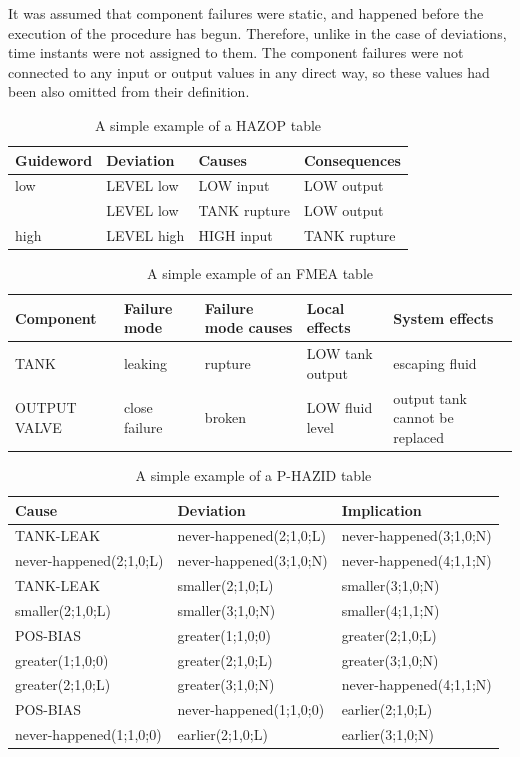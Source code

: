 \documentclass[conference]{IEEEtran}
\begin{document}
It was assumed that component failures were static, and happened before the execution of the procedure has begun. Therefore, unlike in the case of deviations, time instants were not assigned to them. The component failures were not connected to any input or output values in any direct way, so these values had been also omitted from their definition. 

\begin{table}
\centering
\begin{tabular}{|l|l|l|l|}
\hline
Guideword & Deviation & Causes & Consequences \\
\hline
\hline
low & LEVEL low & LOW input & LOW output \\
& LEVEL low & TANK rupture & LOW output \\
\hline
high & LEVEL high & HIGH input & TANK rupture \\
\hline
\end{tabular}
\caption{A simple example of a HAZOP table}
\label{tab:ehazop}
\end{table}

\begin{table}
\centering
\begin{tabular}{|l|l|l|l|l|}
\hline
Component & Failure mode & Failure mode causes & Local effects & System effects \\
\hline
\hline
TANK & leaking & rupture & LOW tank output & escaping fluid \\
\hline
OUTPUT VALVE & close failure & broken & LOW fluid level & output tank cannot be replaced \\
\hline
\end{tabular}
\caption{A simple example of an FMEA table}
\label{tab:efmea}
\end{table}

\begin{table}
\centering
\begin{tabular}{|l|l|l|}
\hline
Cause & Deviation & Implication \\
\hline
\hline
TANK-LEAK & never-happened(2;1,0;L) & never-happened(3;1,0;N) \\
\hline
never-happened(2;1,0;L) & never-happened(3;1,0;N) & never-happened(4;1,1;N) \\
\hline
TANK-LEAK & smaller(2;1,0;L) & smaller(3;1,0;N) \\
\hline
smaller(2;1,0;L) & smaller(3;1,0;N) & smaller(4;1,1;N) \\
\hline
POS-BIAS & greater(1;1,0;0) & greater(2;1,0;L) \\
\hline
greater(1;1,0;0) & greater(2;1,0;L) & greater(3;1,0;N) \\
\hline
greater(2;1,0;L) & greater(3;1,0;N) & never-happened(4;1,1;N) \\
\hline
POS-BIAS& never-happened(1;1,0;0) & earlier(2;1,0;L) \\
\hline
never-happened(1;1,0;0) & earlier(2;1,0;L) & earlier(3;1,0;N) \\
\hline
\end{tabular}
\caption{A simple example of a P-HAZID table}
\label{tab:eprochazid}
\end{table}
\end{document}
